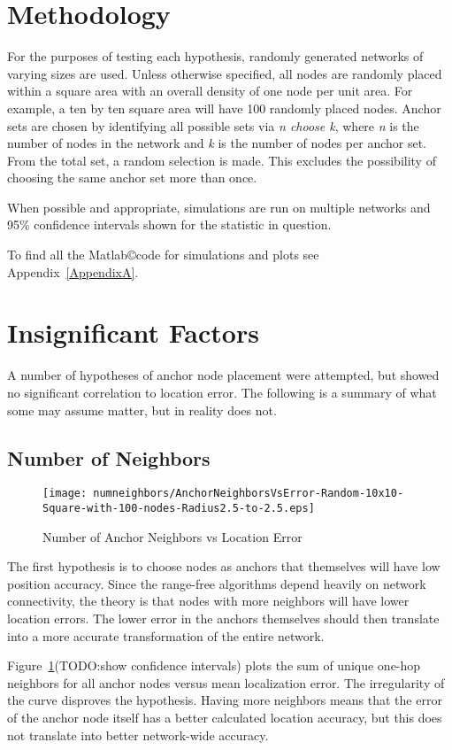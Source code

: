 \section{Methodology}
For the purposes of testing each hypothesis, randomly generated networks of varying sizes are used.  Unless otherwise specified, all nodes are randomly placed within a square area with an overall density of one node per unit area.  For example, a ten by ten square area will have 100 randomly placed nodes.  Anchor sets are chosen by identifying all possible sets via \emph{n choose k}, where \emph{n} is the number of nodes in the network and \emph{k} is the number of nodes per anchor set.  From the total set, a random selection is made.  This excludes the possibility of choosing the same anchor set more than once.

When possible and appropriate, simulations are run on multiple networks and 95\% confidence intervals shown for the statistic in question.  

To find all the Matlab\copyright code for simulations and plots see Appendix~\ref{AppendixA}.

\section{Insignificant Factors}
A number of hypotheses of anchor node placement were attempted, but showed no significant correlation to location error.  The following is a summary of what some may assume matter, but in reality does not.

\subsection{Number of Neighbors}
\begin{figure}
  \centering
      \texttt{[image: numneighbors/AnchorNeighborsVsError-Random-10x10-Square-with-100-nodes-Radius2.5-to-2.5.eps]}
    \caption{Number of Anchor Neighbors vs Location Error}
    \label{fig:Neighbors1}
\end{figure}

The first hypothesis is to choose nodes as anchors that themselves will have low position accuracy.  Since the range-free algorithms depend heavily on network connectivity, the theory is that nodes with more neighbors will have lower location errors.  The lower error in the anchors themselves should then translate into a more accurate transformation of the entire network.

Figure~\ref{fig:Neighbors1}(TODO:show confidence intervals) plots the sum of unique one-hop neighbors for all anchor nodes versus mean localization error.  The irregularity of the curve disproves the hypothesis. Having more neighbors means that the error of the anchor node itself has a better calculated location accuracy, but this does not translate into better network-wide accuracy.


